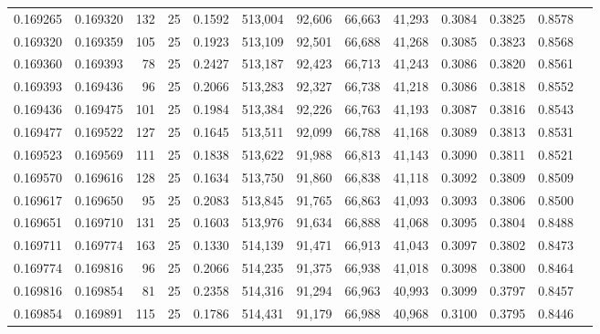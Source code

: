 \begin{tabular}{rrrrrrrrrrrrr}
0.169265 & 0.169320 &   132 &  25 &                                     0.1592 & 513,004 &  92,606 &  66,663 &  41,293 & 0.3084 & 0.3825 & 0.8578 \\
0.169320 & 0.169359 &   105 &  25 &                                     0.1923 & 513,109 &  92,501 &  66,688 &  41,268 & 0.3085 & 0.3823 & 0.8568 \\
0.169360 & 0.169393 &    78 &  25 &                                     0.2427 & 513,187 &  92,423 &  66,713 &  41,243 & 0.3086 & 0.3820 & 0.8561 \\
0.169393 & 0.169436 &    96 &  25 &                                     0.2066 & 513,283 &  92,327 &  66,738 &  41,218 & 0.3086 & 0.3818 & 0.8552 \\
0.169436 & 0.169475 &   101 &  25 &                                     0.1984 & 513,384 &  92,226 &  66,763 &  41,193 & 0.3087 & 0.3816 & 0.8543 \\
0.169477 & 0.169522 &   127 &  25 &                                     0.1645 & 513,511 &  92,099 &  66,788 &  41,168 & 0.3089 & 0.3813 & 0.8531 \\
0.169523 & 0.169569 &   111 &  25 &                                     0.1838 & 513,622 &  91,988 &  66,813 &  41,143 & 0.3090 & 0.3811 & 0.8521 \\
0.169570 & 0.169616 &   128 &  25 &                                     0.1634 & 513,750 &  91,860 &  66,838 &  41,118 & 0.3092 & 0.3809 & 0.8509 \\
0.169617 & 0.169650 &    95 &  25 &                                     0.2083 & 513,845 &  91,765 &  66,863 &  41,093 & 0.3093 & 0.3806 & 0.8500 \\
0.169651 & 0.169710 &   131 &  25 &                                     0.1603 & 513,976 &  91,634 &  66,888 &  41,068 & 0.3095 & 0.3804 & 0.8488 \\
0.169711 & 0.169774 &   163 &  25 &                                     0.1330 & 514,139 &  91,471 &  66,913 &  41,043 & 0.3097 & 0.3802 & 0.8473 \\
0.169774 & 0.169816 &    96 &  25 &                                     0.2066 & 514,235 &  91,375 &  66,938 &  41,018 & 0.3098 & 0.3800 & 0.8464 \\
0.169816 & 0.169854 &    81 &  25 &                                     0.2358 & 514,316 &  91,294 &  66,963 &  40,993 & 0.3099 & 0.3797 & 0.8457 \\
0.169854 & 0.169891 &   115 &  25 &                                     0.1786 & 514,431 &  91,179 &  66,988 &  40,968 & 0.3100 & 0.3795 & 0.8446 \\

\end{tabular}
